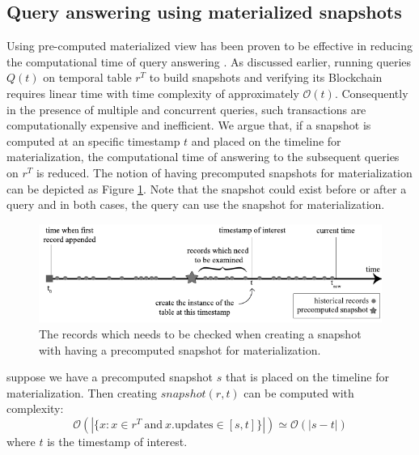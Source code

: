 		

		\subsection{Query answering using materialized snapshots} \label{sec:query_using_snapshots}
			Using pre-computed materialized view has been proven to be effective in reducing the computational time of query answering \cite{sohrabi2016materialized} \cite{du2017deepsea}.  As discussed earlier, running queries $Q(t)$ on temporal table $r^T$ to build snapshots and verifying its Blockchain requires linear time with time complexity of approximately $\mathcal{O}(t)$. Consequently in the presence of multiple and concurrent queries, such transactions are computationally expensive and inefficient. We argue that, if a snapshot is computed at an specific timestamp $t$ and placed on the timeline for materialization, the computational time of answering to the subsequent queries on $r^T$ is reduced. The notion of having precomputed snapshots for materialization can be depicted as Figure \ref{fig:snapshot_materialization}. Note that the snapshot could exist before or after a query and in both cases, the query can use the snapshot for materialization.

			\begin{figure}
				\centering
				\includegraphics[width=\textwidth]{figs/snapshot_materialization.pdf}
				\caption{The records which needs to be checked when creating a snapshot with having a precomputed snapshot for materialization.}
				\label{fig:snapshot_materialization}
			\end{figure}

			\begin{prop}
				suppose we have a precomputed snapshot $s$ that is placed on the timeline for materialization. Then creating $snapshot(r,t)$ can be computed with complexity:
				$$\mathcal{O}(|\{x: x\in r^T\mathrm{\ and\ } x.\mathrm{updates} \in [s,t]\}|) \simeq \mathcal{O}(|s-t|)$$
				where $t$ is the timestamp of interest.
			\label{prop:materialized_snapshot_complexity}
			\end{prop}

